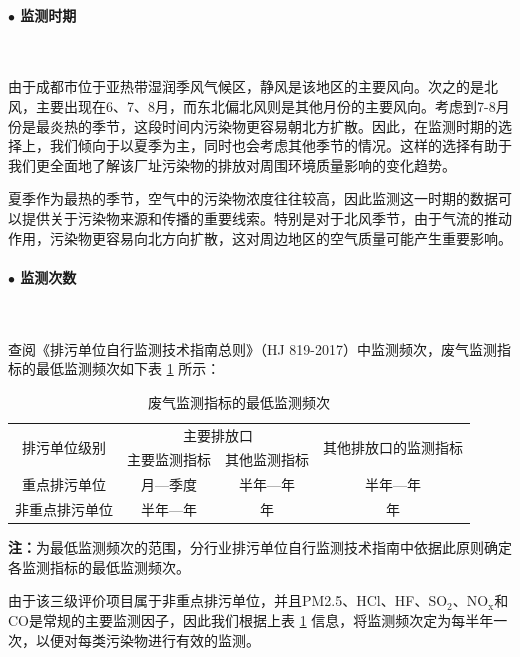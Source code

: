 \paragraph{$\bullet$ 监测时期}~{}\par
由于成都市位于亚热带湿润季风气候区，静风是该地区的主要风向。次之的是北风，主要出现在6、7、8月，而东北偏北风则是其他月份的主要风向。考虑到7-8月份是最炎热的季节，这段时间内污染物更容易朝北方扩散。因此，在监测时期的选择上，我们倾向于以夏季为主，同时也会考虑其他季节的情况。这样的选择有助于我们更全面地了解该厂址污染物的排放对周围环境质量影响的变化趋势。

夏季作为最热的季节，空气中的污染物浓度往往较高，因此监测这一时期的数据可以提供关于污染物来源和传播的重要线索。特别是对于北风季节，由于气流的推动作用，污染物更容易向北方向扩散，这对周边地区的空气质量可能产生重要影响。

\paragraph{$\bullet$ 监测次数}~{}\par

查阅《排污单位自行监测技术指南\hspace{1em}总则》（HJ 819-2017）中监测频次，废气监测指标的最低监测频次如下表 \ref{tab:The minimum monitoring frequency of exhaust gas monitoring indicators} 所示：
\begin{table}[H]
    \centering
    \caption{废气监测指标的最低监测频次\cite{HJ819-2017}}
    \begin{tabular}{cccc}
    \toprule
    \multirow{2}[4]{*}{排污单位级别} & \multicolumn{2}{c}{主要排放口} & \multirow{2}[4]{*}{其他排放口的监测指标} \\
    \cmidrule{2-3}     & 主要监测指标 & 其他监测指标 &  \\
    \midrule
    重点排污单位 & 月—季度  & 半年—年  & 半年—年 \\
    非重点排污单位 & 半年—年  & 年     & 年 \\
    \bottomrule
    \end{tabular}%
    \label{tab:The minimum monitoring frequency of exhaust gas monitoring indicators}%
\end{table}%
\noindent\textbf{注：}为最低监测频次的范围，分行业排污单位自行监测技术指南中依据此原则确定各监测指标的最低监测频次。

由于该三级评价项目属于非重点排污单位，并且PM2.5、HCl、HF、$\mathrm{SO_2}$、$\mathrm{NO_x}$和CO是常规的主要监测因子，因此我们根据上表 \ref{tab:The minimum monitoring frequency of exhaust gas monitoring indicators} 信息，将监测频次定为每半年一次，以便对每类污染物进行有效的监测。

